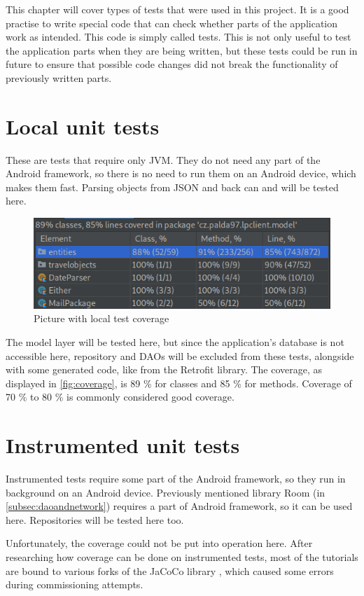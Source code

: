 This chapter will cover types of tests that were used in this project.
It is a good practise to write special code that can check whether parts of the application work as intended.
This code is simply called tests.
This is not only useful to test the application parts when they are being written, but these tests could be run in future to ensure that possible code changes did not break the functionality of previously written parts.


\section{Local unit tests}
These are tests that require only JVM.
They do not need any part of the Android framework, so there is no need to run them on an Android device, which makes them fast.
Parsing objects from JSON and back can and will be tested here.

\begin{figure}\centering
	\includegraphics[width=1\textwidth]{pics/coverage.png}
	\caption[Test Coverage]{Picture with local test coverage}\label{fig:coverage}
\end{figure}

The model layer will be tested here, but since the application’s database is not accessible here, repository and DAOs will be excluded from these tests, alongside with some generated code, like from the Retrofit library.
The coverage, as displayed in \autoref{fig:coverage}, is 89 \% for classes and 85 \% for methods.
Coverage of 70 \% to 80 \% is commonly considered good coverage.

\section{Instrumented unit tests}
Instrumented tests require some part of the Android framework, so they run in background on an Android device.
Previously mentioned library Room (in \autoref{subsec:daoandnetwork}) requires a part of Android framework, so it can be used here.
Repositories will be tested here too.

Unfortunately, the coverage could not be put into operation here.
After researching how coverage can be done on instrumented tests, most of the tutorials are bound to various forks of the JaCoCo library \cite{jacoco}, which caused some errors during commissioning attempts.
